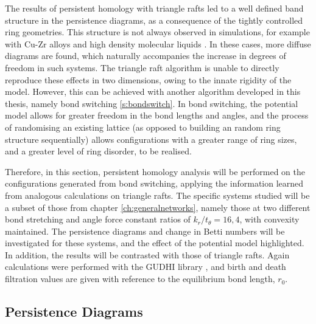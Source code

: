The results of persistent homology with triangle rafts led to a well defined band structure in the persistence diagrams, as a consequence of the tightly controlled ring geometries.
This structure is not always observed in simulations, for example with Cu\--Zr alloys and high density molecular liquids \cite{Hiraoka2016,Onodera2019}.
In these cases, more diffuse diagrams are found, which naturally accompanies the increase in degrees of freedom in such systems.
The triangle raft algorithm is unable to directly reproduce these effects in two dimensions, owing to the innate rigidity of the model.
However, this can be achieved with another algorithm developed in this thesis, namely bond switching \ref{s:bondswitch}.
In bond switching, the potential model allows for greater freedom in the bond lengths and angles, and the process of randomising an existing lattice (as opposed to building an random ring structure sequentially) allows configurations with a greater range of ring sizes, and a greater level of ring disorder, to be realised.

Therefore, in this section, persistent homology analysis will be performed on the configurations generated from bond switching, applying the information learned from analogous calculations on triangle rafts.
The specific systems studied will be a subset of those from chapter \ref{ch:generalnetworks}, namely those at two different bond stretching and angle force constant ratios of $k_r/t_\theta=16,4$, with convexity maintained.
The persistence diagrams and change in Betti numbers will be investigated for these systems, and the effect of the potential model highlighted.
In addition, the results will be contrasted with those of triangle rafts.
Again calculations were performed with the GUDHI library \cite{gudhi}, and birth and death filtration values are given with reference to the equilibrium bond length, $r_0$.

\subsection{Persistence Diagrams}

